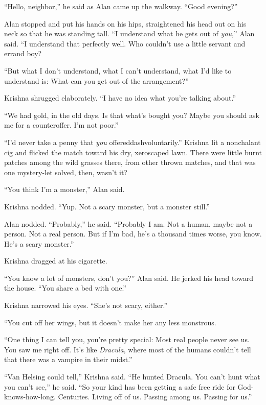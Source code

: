 ``Hello, neighbor,'' he said as Alan came up the walkway.  ``Good
evening?''

Alan stopped and put his hands on his hips, straightened his head out
on his neck so that he was standing tall.  ``I understand what he gets
out of \textit{you},'' Alan said.  ``I understand that perfectly well. 
Who couldn't use a little servant and errand boy?

``But what I don't understand, what I can't understand, what I'd like
to understand is:  What can you get out of the arrangement?''

Krishna shrugged elaborately.  ``I have no idea what you're talking
about.''

``We had gold, in the old days.  Is that what's bought you?  Maybe you
should ask me for a counteroffer.  I'm not poor.''

``I'd never take a penny that \textit{you} offereddash{}voluntarily.''
Krishna lit a nonchalant cig and flicked the match toward his dry,
xeroscaped lawn.  There were little burnt patches among the wild
grasses there, from other thrown matches, and that was one mystery-let
solved, then, wasn't it?

``You think I'm a monster,'' Alan said.

Krishna nodded.  ``Yup.  Not a scary monster, but a monster still.''

Alan nodded.  ``Probably,'' he said.  ``Probably I am.  Not a human,
maybe not a person.  Not a real person.  But if I'm bad, he's a
thousand times worse, you know.  He's a scary monster.''

Krishna dragged at his cigarette.

``You know a lot of monsters, don't you?'' Alan said.  He jerked his
head toward the house.  ``You share a bed with one.''

Krishna narrowed his eyes.  ``She's not scary, either.''

``You cut off her wings, but it doesn't make her any less monstrous.

``One thing I can tell you, you're pretty special:  Most real people
never see us.  You saw me right off.  It's like \textit{Dracula},
where most of the humans couldn't tell that there was a vampire in
their midst.''

``Van Helsing could tell,'' Krishna said.  ``He hunted Dracula.  You
can't hunt what you can't see,'' he said.  ``So your kind has been
getting a safe free ride for God-knows-how-long.  Centuries.  Living
off of us.  Passing among us.  Passing for us.''

